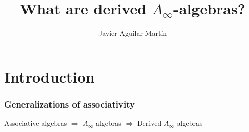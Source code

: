 \documentclass{beamer}
\title{What are derived $A_\infty$-algebras?}
\author{Javier Aguilar Mart\'in}
\date{}
\institute{ECRM 2022}
\theoremstyle{definition}
\begin{document}
\frame{\titlepage}

%
% 
% 
% 

% 



\newcommand{\seti}{\setcounter{saveenumi}{\value{enumi}}}
\newcommand{\conti}{\setcounter{enumi}{\value{saveenumi}}}

\makeatletter
\makeatother


%
%
%
%
%
%
%
\section{Introduction}
\begin{frame}
\frametitle{Generalizations of associativity}

Associative algebras $\Rightarrow$ $A_\infty$-algebras $\Rightarrow$ Derived $A_\infty$-algebras

\end{frame}
\end{document}
